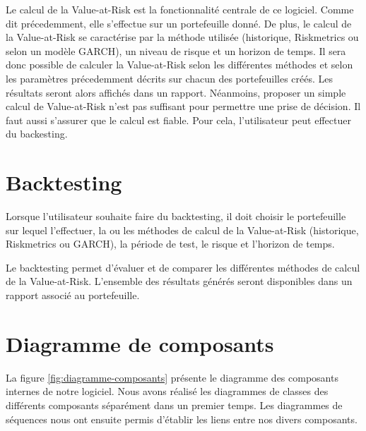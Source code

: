 \documentclass[a4paper,titlepage,french]{report}
\begin{document}
Le calcul de la Value-at-Risk est la fonctionnalité centrale de ce logiciel. Comme dit précedemment, elle s'effectue sur un portefeuille donné.
De plus, le calcul de la Value-at-Risk se caractérise par la méthode utilisée (historique, Riskmetrics ou selon un modèle GARCH), un niveau de risque et un horizon de temps.
Il sera donc possible de calculer la Value-at-Risk selon les différentes méthodes et selon les paramètres précedemment décrits sur chacun des portefeuilles créés.
Les résultats seront alors affichés dans un rapport. Néanmoins, proposer un simple calcul de Value-at-Risk n'est pas suffisant pour permettre une prise de décision.
Il faut aussi s'assurer que le calcul est fiable.
Pour cela, l'utilisateur peut effectuer du backesting.


\section{Backtesting}

Lorsque l’utilisateur souhaite faire du backtesting, il doit choisir le portefeuille sur lequel l’effectuer, la ou les méthodes de calcul de la Value-at-Risk (historique, Riskmetrics ou GARCH), la période de test, le risque et l’horizon de temps.

Le backtesting permet d'évaluer et de comparer les différentes méthodes de calcul de la Value-at-Risk.
L'ensemble des résultats générés seront disponibles dans un rapport associé au portefeuille.


\section{Diagramme de composants}

La figure \ref{fig:diagramme-composants} présente le diagramme des composants internes de notre logiciel.
Nous avons réalisé les diagrammes de classes des différents composants séparément dans un premier temps.
Les diagrammes de séquences nous ont ensuite permis d'établir les liens entre nos divers composants.

\end{document}
